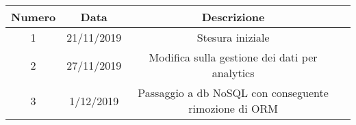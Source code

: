  \\ \\
\begin{tabular}{|c | c | c | c|} 
 	\hline
	 Numero & Data & Descrizione \\ [0.5ex] 
	\hline\hline
	1 & 21/11/2019 & Stesura iniziale \\ 
	\hline
	2 & 27/11/2019 & Modifica sulla gestione dei dati per analytics \\
	\hline
	3 & 1/12/2019 & Passaggio a db NoSQL con conseguente rimozione di ORM \\
	\hline
\end{tabular}